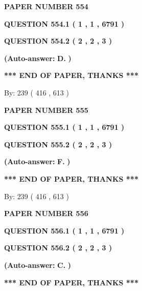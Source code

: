 \documentclass[12pt]{article}
\begin{document}
   
 {\textbf{ \Large{ PAPER NUMBER  554  }}}
   
   
   
   
  
  
{\textbf{\large{QUESTION
554.1 
 ( 1 , 1 , 6791 )
}}}
  
  
{\textbf{\large{QUESTION
554.2 
 ( 2 , 2 , 3 )
}}}
 
 
{\textbf{(Auto-answer:}}
{\textbf{\large{
D.}}}
{\textbf{)}}
 
 
   
   
   
   
\vspace{1.0in} 
{\textbf{\large{ *** END OF PAPER, THANKS *** }}} 
   
   
\hspace{1.0in} By: 
 239 ( 416 ,  613 )
   
   
   
   
\newpage 
\setcounter{page}{ 
   555001 } 
   
   
 {\textbf{ \Large{ PAPER NUMBER  555  }}}
   
   
   
   
  
  
{\textbf{\large{QUESTION
555.1 
 ( 1 , 1 , 6791 )
}}}
  
  
{\textbf{\large{QUESTION
555.2 
 ( 2 , 2 , 3 )
}}}
 
 
{\textbf{(Auto-answer:}}
{\textbf{\large{
F.}}}
{\textbf{)}}
 
 
   
   
   
   
\vspace{1.0in} 
{\textbf{\large{ *** END OF PAPER, THANKS *** }}} 
   
   
\hspace{1.0in} By: 
 239 ( 416 ,  613 )
   
   
   
   
\newpage 
\setcounter{page}{ 
   556001 } 
   
   
 {\textbf{ \Large{ PAPER NUMBER  556  }}}
   
   
   
   
  
  
{\textbf{\large{QUESTION
556.1 
 ( 1 , 1 , 6791 )
}}}
  
  
{\textbf{\large{QUESTION
556.2 
 ( 2 , 2 , 3 )
}}}
 
 
{\textbf{(Auto-answer:}}
{\textbf{\large{
C.}}}
{\textbf{)}}
 
 
   
   
   
   
\vspace{1.0in} 
{\textbf{\large{ *** END OF PAPER, THANKS *** }}} 
   
\end{document}
